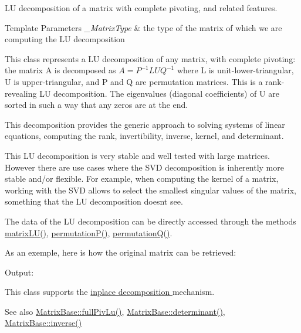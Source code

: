 LU decomposition of a matrix with complete pivoting, and related features. 


\begin{DoxyTemplParams}{Template Parameters}
{\em \+\_\+\+Matrix\+Type} & the type of the matrix of which we are computing the LU decomposition\\
\hline
\end{DoxyTemplParams}
This class represents a LU decomposition of any matrix, with complete pivoting\+: the matrix A is decomposed as $ A = P^{-1} L U Q^{-1} $ where L is unit-\/lower-\/triangular, U is upper-\/triangular, and P and Q are permutation matrices. This is a rank-\/revealing LU decomposition. The eigenvalues (diagonal coefficients) of U are sorted in such a way that any zeros are at the end.

This decomposition provides the generic approach to solving systems of linear equations, computing the rank, invertibility, inverse, kernel, and determinant.

This LU decomposition is very stable and well tested with large matrices. However there are use cases where the S\+VD decomposition is inherently more stable and/or flexible. For example, when computing the kernel of a matrix, working with the S\+VD allows to select the smallest singular values of the matrix, something that the LU decomposition doesn\textquotesingle{}t see.

The data of the LU decomposition can be directly accessed through the methods \hyperlink{group___l_u___module_afea0b8fc707a9097d46fe358cb18bbff}{matrix\+L\+U()}, \hyperlink{group___l_u___module_a09274c82240f6441af5e6c99e24e756d}{permutation\+P()}, \hyperlink{group___l_u___module_a8d18190c7618de271cba7293f0493a36}{permutation\+Q()}.

As an exemple, here is how the original matrix can be retrieved\+: 
\begin{DoxyCodeInclude}
\end{DoxyCodeInclude}
 Output\+: 
\begin{DoxyVerbInclude}
\end{DoxyVerbInclude}


This class supports the \hyperlink{group___inplace_decomposition}{inplace decomposition } mechanism.

\begin{DoxySeeAlso}{See also}
\hyperlink{group___core___module_a25da97d31acab0ee5d9d13bdbb0569da}{Matrix\+Base\+::full\+Piv\+Lu()}, \hyperlink{group___core___module_a7ad8f77004bb956b603bb43fd2e3c061}{Matrix\+Base\+::determinant()}, \hyperlink{group___core___module_a7712eb69e8ea3c8f7b8da1c44dbdeebf}{Matrix\+Base\+::inverse()} 
\end{DoxySeeAlso}



